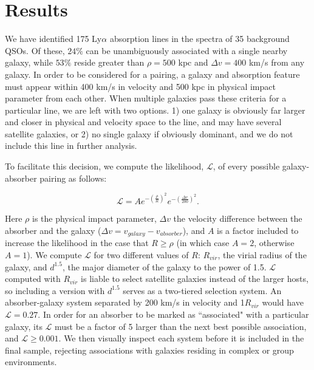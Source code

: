 \documentclass[iop]{emulateapj-rtx4}
\begin{document}
\section{Results}

We have identified 175 Ly$\alpha$ absorption lines in the spectra of 35 background QSOs. Of these, $24\%$ can be unambiguously associated with a single nearby galaxy, while $53\%$ reside greater than $\rho = 500$ kpc and $\Delta v = 400$ km/s from any galaxy. In order to be considered for a pairing, a galaxy and absorption feature must appear within 400 km/s in velocity and 500 kpc in physical impact parameter from each other. When multiple galaxies pass these criteria for a particular line, we are left with two options. 1) one galaxy is obviously far larger and closer in physical and velocity space to the line, and may have several satellite galaxies, or 2) no single galaxy if obviously dominant, and we do not include this line in further analysis. 

To facilitate this decision, we compute the likelihood, $\mathcal{L}$, of every possible galaxy-absorber pairing as follows:

\begin{equation}
	\mathcal{L} = A e^{-(\frac{\rho}{R})^2} e^{-(\frac{\Delta v}{200})^2}.
\end{equation}

\noindent Here $\rho$ is the physical impact parameter, $\Delta v$ the velocity difference between the absorber and the galaxy ($\Delta v = v_{galaxy} - v_{absorber}$), and $A$ is a factor included to increase the likelihood in the case that $R \geq \rho$ (in which case $A = 2$, otherwise $A = 1$). We compute $\mathcal{L}$ for two different values of $R$: $R_{vir}$, the virial radius of the galaxy, and $d^{1.5}$, the major diameter of the galaxy to the power of 1.5. $\mathcal{L}$ computed with $R_{vir}$ is liable to select satellite galaxies instead of the larger hosts, so including a version with $d^{1.5}$ serves as a two-tiered selection system. An absorber-galaxy system separated by 200 km/s in velocity and 1$R_{vir}$ would have $\mathcal{L} = 0.27$. In order for an absorber to be marked as ``associated" with a particular galaxy, its $\mathcal{L}$ must be a factor of 5 larger than the next best possible association, and $\mathcal{L} \ge 0.001$. We then visually inspect each system before it is included in the final sample, rejecting associations with galaxies residing in complex or group environments.
\end{document}
